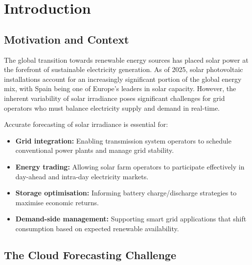 \documentclass[11pt,a4paper]{article}
\begin{document}
\newpage
\tableofcontents
\newpage

\section{Introduction}
\label{sec:introduction}

\subsection{Motivation and Context}

The global transition towards renewable energy sources has placed solar power at the forefront of sustainable electricity generation. As of 2025, solar photovoltaic installations account for an increasingly significant portion of the global energy mix, with Spain being one of Europe's leaders in solar capacity. However, the inherent variability of solar irradiance poses significant challenges for grid operators who must balance electricity supply and demand in real-time.

Accurate forecasting of solar irradiance is essential for:
\begin{itemize}[noitemsep]
    \item \textbf{Grid integration:} Enabling transmission system operators to schedule conventional power plants and manage grid stability.
    \item \textbf{Energy trading:} Allowing solar farm operators to participate effectively in day-ahead and intra-day electricity markets.
    \item \textbf{Storage optimisation:} Informing battery charge/discharge strategies to maximise economic returns.
    \item \textbf{Demand-side management:} Supporting smart grid applications that shift consumption based on expected renewable availability.
\end{itemize}

\subsection{The Cloud Forecasting Challenge}
\end{document}
